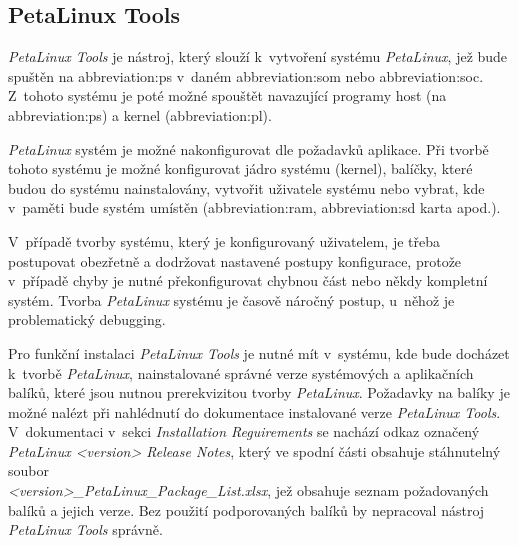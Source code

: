 \documentclass[a4paper, twoside, 11pt]{article}
\begin{document}
		\subsection{PetaLinux Tools}\label{subsec:petalinux-tools}
			\textit{PetaLinux Tools} je nástroj, který slouží k~vytvoření systému \textit{PetaLinux}, jež bude spuštěn na \gls{abbreviation:ps} v~daném \gls{abbreviation:som} nebo \gls{abbreviation:soc}. Z~tohoto systému je poté možné spouštět navazující programy host (na \gls{abbreviation:ps}) a kernel (\gls{abbreviation:pl}).\par
			\textit{PetaLinux} systém je možné nakonfigurovat dle požadavků aplikace. Při tvorbě tohoto systému je možné konfigurovat jádro systému (kernel), balíčky, které budou do systému nainstalovány, vytvořit uživatele systému nebo vybrat, kde v~paměti bude systém umístěn (\gls{abbreviation:ram}, \gls{abbreviation:sd} karta apod.). \cite{xilinx-petalinux}\par
			V~případě tvorby systému, který je konfigurovaný uživatelem, je třeba postupovat obezřetně a dodržovat nastavené postupy konfigurace, protože v~případě chyby je nutné překonfigurovat chybnou část nebo někdy kompletní systém. Tvorba \textit{PetaLinux} systému je časově náročný postup, u~něhož je problematický debugging.\par
			Pro funkční instalaci \textit{PetaLinux Tools} je nutné mít v~systému, kde bude docházet k~tvorbě \textit{PetaLinux}, nainstalované správné verze systémových a aplikačních balíků, které jsou nutnou prerekvizitou tvorby \textit{PetaLinux}. Požadavky na balíky je možné nalézt při nahlédnutí do dokumentace \cite{petalinux-tools-documentation-2022} instalované verze \textit{PetaLinux Tools}. V~dokumentaci v~sekci \textit{Installation Reguirements} se nachází odkaz označený \textit{PetaLinux <version> Release Notes}, který ve spodní části obsahuje stáhnutelný soubor\\\textit{<version>\_PetaLinux\_Package\_List.xlsx}, jež obsahuje seznam požadovaných balíků a jejich verze. Bez použití podporovaných balíků by nepracoval nástroj \textit{PetaLinux Tools} správně.
\end{document}
